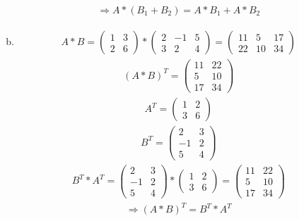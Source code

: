 \documentclass[a4paper]{scrartcl}
\begin{document}
\begin{enumerate}
\begin{enumerate}[a)]
\begin{align*}
\Rightarrow A*(B_1 + B_2) = A*B_1+A*B_2
\end{align*}

\item
\begin{align*}
A*B =
\begin{pmatrix}
1 & 3 \\
2 & 6
\end{pmatrix}
*
\begin{pmatrix}
2 & -1 & 5 \\
3 & 2 & 4
\end{pmatrix}
=
\begin{pmatrix}
11 & 5 & 17 \\
22 & 10 & 34
\end{pmatrix}
\end{align*}
\begin{align*}
(A*B)^T =
\begin{pmatrix}
11 & 22 \\
5 & 10 \\
17 & 34
\end{pmatrix}
\end{align*}
\begin{align*}
A^T =
\begin{pmatrix}
1 & 2 \\
3 & 6
\end{pmatrix}
\end{align*}
\begin{align*}
B^T =
\begin{pmatrix}
2 & 3 \\
-1 & 2 \\
5 & 4 
\end{pmatrix}
\end{align*}
\begin{align*}
B^T*A^T =
\begin{pmatrix}
2 & 3 \\
-1 & 2 \\
5 & 4 
\end{pmatrix}
*
\begin{pmatrix}
1 & 2 \\
3 & 6
\end{pmatrix}
=
\begin{pmatrix}
11 & 22 \\
5 & 10 \\
17 & 34
\end{pmatrix}
\end{align*}
\begin{align*}
\Rightarrow (A*B)^T = B^T*A^T
\end{align*}
\end{enumerate}


\end{enumerate}
\end{document}
